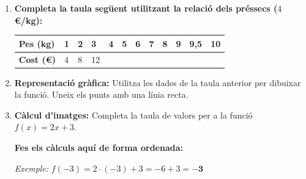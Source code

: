 \documentclass[12pt,a4paper]{article}
\begin{document}
\begin{enumerate}[leftmargin=*, label=\textbf{\arabic*.}]

    \item \textbf{Completa la taula següent utilitzant la relació dels préssecs ($4$ €/kg):}
    
    \vspace{0.2cm}
    \renewcommand{\arraystretch}{1.5}
    \begin{tabularx}{\textwidth}{|l|*{11}{X|}}
        \hline
        \textbf{Pes (kg)} & 1 & 2 & 3 & 4 & 5 & 6 & 7 & 8 & 9 & 9,5 & 10 \\ \hline
        \textbf{Cost (€)} & 4 & 8 & 12 & & & & & & & & \\ \hline
    \end{tabularx}

    \item \textbf{Representació gràfica:} Utilitza les dades de la taula anterior per dibuixar la funció. Uneix els punts amb una línia recta.
    
    \begin{center}
    \end{center}

    \item \textbf{Càlcul d'imatges:} Completa la taula de valors per a la funció $f(x) = 2x + 3$.
    
    \textbf{Fes els càlculs aquí de forma ordenada:}
    
    \vspace{0.1cm}
    \textit{Exemple:} $f(-3) = 2 \cdot (-3) + 3 = -6 + 3 = \mathbf{-3}$
    \vspace{0.1cm}


\end{enumerate}
\end{document}
